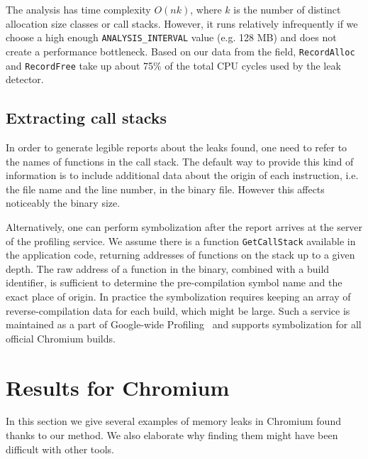 \documentclass[preprint, numbers]{sigplanconf}
\newcommand{\comment}[1]{{\color{blue}{#1}}}
\begin{document}
The analysis has time complexity $O(nk)$, where $k$ is the number of distinct allocation size classes or call stacks. However, it runs relatively infrequently if we choose a high enough \texttt{ANALYSIS\_INTERVAL} value (e.g. 128 MB) and does not create a performance bottleneck. Based on our data from the field, \texttt{RecordAlloc} and \texttt{RecordFree} take up about 75\% of the total CPU cycles used by the leak detector.

\comment{Citation: CWP dashboard shows ~4000 samples from leak detector code. ~3000 are from these two functions.}


\subsection{Extracting call stacks}

In order to generate legible reports about the leaks found, one
need to refer to the names of functions in the call stack.
The default way to provide this kind of information is to
include additional data about the origin of each instruction,
i.e. the file name and the line number, in the binary file.
However this affects noticeably the binary size.

Alternatively, one can perform symbolization after the report
arrives at the server of the profiling service.
We assume there is a function \texttt{GetCallStack}
available in the application code, returning addresses of functions on the stack
up to a given depth.
The raw address of a function in the binary, combined with a build identifier,
is sufficient to determine the pre-compilation symbol name and the
exact place of origin.
In practice the symbolization requires keeping an array of reverse-compilation data for each build,
which might be large.
Such a service is maintained as a part of Google-wide Profiling~\cite{gwp}
and supports symbolization for all official Chromium builds.
\comment{Doesn't this part disclose too much about authors' affiliation?}

\section{Results for Chromium}
\label{sec:results}

In this section we give several examples of memory leaks in Chromium found
thanks to our method.
We also elaborate why finding them might have been difficult with other tools.
\comment{Remove this if we do not say anything about that.
Maybe include charts with allocation history for each bug?}
\end{document}
